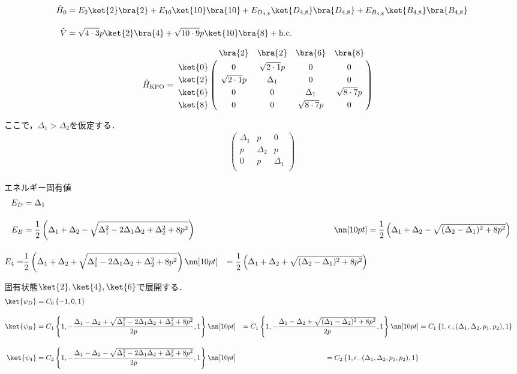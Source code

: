 \begin{align}
    \hat{H}_0 &= E_{2}\ket{2}\bra{2} + E_{10} \ket{10}\bra{10} + E_{D_{4,8}} \ket{D_{4,8}}\bra{D_{4,8}}+ E_{B_{4,8}} \ket{B_{4,8}}\bra{B_{4,8}}\\[10pt]
    \hat{V}&= \sqrt{4\cdot3}p\ket{2}\bra{4} + \sqrt{10\cdot9}p\ket{10}\bra{8} + {\rm{h.c.}}
\end{align}


\begin{align}
     \hat{H}_{\rm{KPO}}
    &=
   \bordermatrix{     
    & \bra{2} &  \bra{2} &  \bra{6}&  \bra{8}\cr
   \ket{0}&0&\sqrt{2\cdot1}p&0&0\cr
  \ket{2}&\sqrt{2\cdot1}p&\Delta_1&0&0\cr
  \ket{6}&0&0&\Delta_1&\sqrt{8\cdot7}p\cr
  \ket{8}&0&0&\sqrt{8\cdot7}p&0\cr
            }
\end{align}











ここで，$\Delta_1>\Delta_2$を仮定する．
\begin{align}
    \left(\begin{array}{ccc}
  \Delta_1&p&0\\[5pt]
  p&\Delta_2&p\\[5pt]
  0&p&\Delta_1\\[5pt]
  \end{array}\right)    
\end{align}


エネルギー固有値
\begin{align}
    E_D&=
    {\Delta_{1}}\\[10pt]
    E_B&=
    \frac{1}{2}\left(\Delta_1+\Delta_2-\sqrt{\Delta_1^2-2\Delta_1\Delta_2+\Delta_2^2+8p^2}\right)&\nn[10pt]
    &=\frac{1}{2}\left({\Delta_{1}}+{\Delta_{2}}-\sqrt{{
    (\Delta_{2}}-{\Delta_{1}})^2+8{p}^2}\right)\\[10pt]
    E_4=&\frac{1}{2}\left(\Delta_1+\Delta_2+\sqrt{\Delta_1^2-2\Delta_1\Delta_2+\Delta_2^2+8p^2}\right)
    \nn[10pt]
    &=\frac{1}{2}\left({\Delta_{1}}+{\Delta_{2}}
    +\sqrt{{
    (\Delta_{2}}-{\Delta_{1}})^2+8p^2}\right)
\end{align}

固有状態$\ket{2}, \ket{4}, \ket{6}$で展開する．
\begin{align}
    \ket{\psi_D}&=C_0\left\{-1,0,1\right\}\\[10pt]
    \ket{\psi_B}&=C_1\left\{1,-\frac{\Delta_1-\Delta_2+\sqrt{\Delta_1^2-2\Delta_1\Delta_2+\Delta_2^2+8p^2}}{2p},1\right\}\nn[10pt]
    &=C_1\left\{1,-\frac{{\Delta_{1}}-{\Delta_{2}}
    +\sqrt{({\Delta_{1}}-{\Delta_{2}})^2+8{p^2}}}{2{p}},1\right\}\nn[10pt]
    &=C_1\left\{1,
    \epsilon_+({\Delta_{1}},{\Delta_{2}},
    p_1,p_2)
    ,1\right\}\\[10pt]
    \ket{\psi_4}&=C_2\left\{1,-\frac{\Delta_1-\Delta_2-\sqrt{\Delta_1^2-2\Delta_1\Delta_2+\Delta_2^2+8p^2}}{2p},1\right\}\nn[10pt]
    &=C_2\left\{1,
    \epsilon_-({\Delta_{1}},{\Delta_{2}},
    p_1,p_2)
    ,1\right\}
\end{align}





